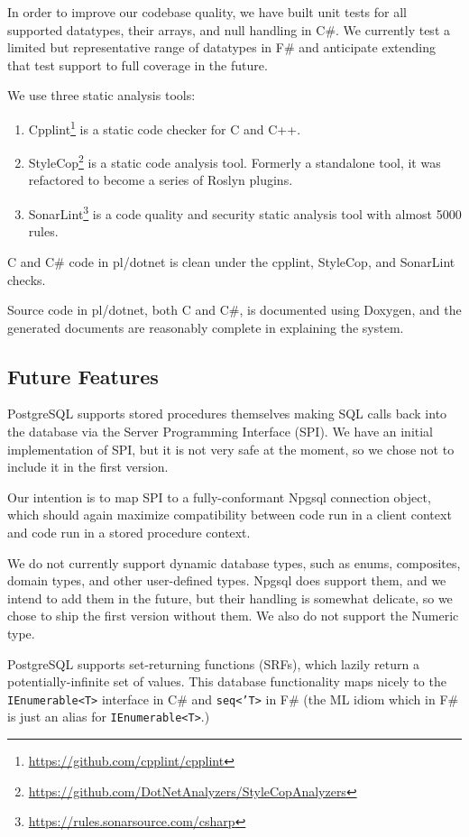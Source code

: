 \documentclass[sigconf,techreport,authorversion,nonacm]{acmart}
\begin{document}
In order to improve our codebase quality, we have built unit tests for all supported datatypes, their arrays, and null handling in C\#.
We currently test a limited but representative
range of datatypes in F\# and anticipate extending that test support
to full coverage in the future.

We use three static analysis tools:
\begin{enumerate}[itemsep=0pt]
        \item Cpplint\footnote{\url{ https://github.com/cpplint/cpplint}} is a static code checker for C and C++.
        \item StyleCop\footnote{\url{ https://github.com/DotNetAnalyzers/StyleCopAnalyzers}} is a static code analysis tool. Formerly a standalone tool, it was refactored to become a series of Roslyn plugins.
        \item SonarLint\footnote{\url{ https://rules.sonarsource.com/csharp}} is a code quality and security static analysis tool with almost 5000 rules.
\end{enumerate}

C and C\# code in pl/dotnet is clean under the cpplint, StyleCop, and
SonarLint checks.

Source code in pl/dotnet, both C and C\#, is documented using Doxygen,
and the generated documents are reasonably complete in explaining
the system.

\subsection{Future Features}

PostgreSQL supports stored procedures themselves making SQL calls back
into the database via the Server Programming Interface (SPI). We
have an initial implementation of SPI, but it is not very safe at
the moment, so we chose not to include it in the first version.

Our intention is to map SPI to a fully-conformant Npgsql connection
object, which should again maximize compatibility between code
run in a client context and code run in a stored procedure context.

We do not currently support dynamic database types, such as enums,
composites, domain types, and other user-defined types. Npgsql
does support them, and we intend to add them in the future, but
their handling is somewhat delicate, so we chose to ship the first
version without them.  We also do not support the Numeric type.

PostgreSQL supports set-returning functions (SRFs), which lazily
return a potentially-infinite set of values. This database
functionality maps nicely to the \texttt{IEnumerable<T>} interface
in C\# and \texttt{seq<'T>} in F\# (the ML idiom which in F\# is
just an alias for \texttt{IEnumerable<T>}.)
\end{document}
